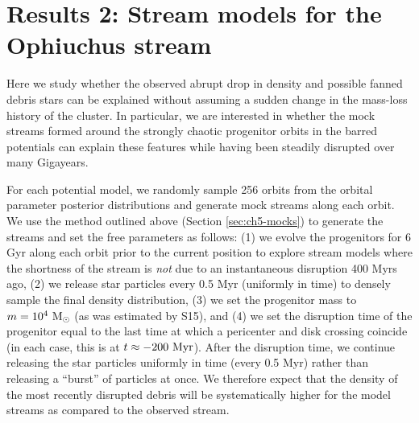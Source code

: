 \section{Results 2: Stream models for the Ophiuchus stream}\label{sec:ch5-results2}

Here we study whether the observed abrupt drop in density and possible fanned
debris stars can be explained without assuming a sudden change in the mass-loss
history of the cluster. In particular, we are interested in whether the mock
streams formed around the strongly chaotic progenitor orbits in the barred
potentials can explain these features while having been steadily disrupted over
many Gigayears.

For each potential model, we randomly sample 256 orbits from the orbital
parameter posterior distributions and generate mock streams along each orbit. We
use the method outlined above (Section \ref{sec:ch5-mocks}) to generate the streams
and set the free parameters as follows: (1) we evolve the progenitors for 6 Gyr
along each orbit prior to the current position to explore stream models where
the shortness of the stream is \emph{not} due to an instantaneous disruption 400
Myrs ago, (2) we release star particles every 0.5 Myr (uniformly in time) to
densely sample the final density distribution, (3) we set the progenitor mass to
$m=10^4~\mathrm{M}_\odot$ (as was estimated by S15), and (4) we set the disruption time of
the progenitor equal to the last time at which a pericenter and disk crossing
coincide (in each case, this is at $t \approx -200~{\rm Myr}$). After the
disruption time, we continue releasing the star particles uniformly in time
(every 0.5 Myr) rather than releasing a ``burst'' of particles at once. We
therefore expect that the density of the most recently disrupted debris will be
systematically higher for the model streams as compared to the observed stream.

